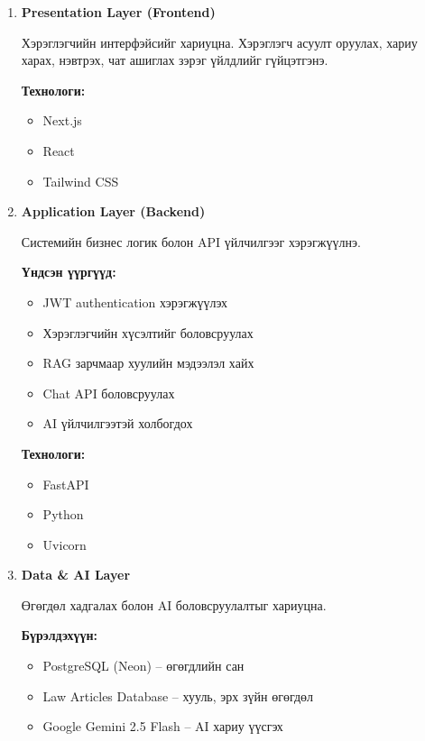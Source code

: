 \begin{enumerate}
    \item \textbf{Presentation Layer (Frontend)}

    Хэрэглэгчийн интерфэйсийг хариуцна. Хэрэглэгч асуулт оруулах, хариу харах, нэвтрэх, чат ашиглах зэрэг үйлдлийг гүйцэтгэнэ.

    \textbf{Технологи:}
    \begin{itemize}
        \item Next.js
        \item React
        \item Tailwind CSS
    \end{itemize}

    \item \textbf{Application Layer (Backend)}

    Системийн бизнес логик болон API үйлчилгээг хэрэгжүүлнэ.

    \textbf{Үндсэн үүргүүд:}
    \begin{itemize}
        \item JWT authentication хэрэгжүүлэх
        \item Хэрэглэгчийн хүсэлтийг боловсруулах
        \item RAG зарчмаар хуулийн мэдээлэл хайх
        \item Chat API боловсруулах
        \item AI үйлчилгээтэй холбогдох
    \end{itemize}

    \textbf{Технологи:}
    \begin{itemize}
        \item FastAPI
        \item Python
        \item Uvicorn
    \end{itemize}

    \item \textbf{Data \& AI Layer}

    Өгөгдөл хадгалах болон AI боловсруулалтыг хариуцна.

    \textbf{Бүрэлдэхүүн:}
    \begin{itemize}
        \item PostgreSQL (Neon) -- өгөгдлийн сан
        \item Law Articles Database -- хууль, эрх зүйн өгөгдөл
        \item Google Gemini 2.5 Flash -- AI хариу үүсгэх
    \end{itemize}
\end{enumerate}

